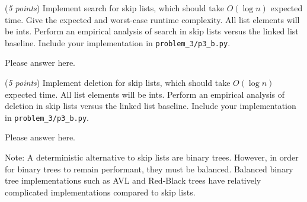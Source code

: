 \documentclass{hw_template}
\begin{document}
\begin{problem}
\begin{subproblem}
(\textit{5 points}) Implement search for skip lists, which should take $O(\log n)$ expected time.
Give the expected and worst-case runtime complexity.
All list elements will be ints.
Perform an empirical analysis of search in skip lists versus the linked list baseline.
Include your implementation in \texttt{problem\_3/p3\_b.py}.
\end{subproblem}
\begin{solution}
Please answer here.
\end{solution}


\begin{subproblem}
(\textit{5 points}) Implement deletion for skip lists, which should take $O(\log n)$ expected time.
All list elements will be ints.
Perform an empirical analysis of deletion in skip lists versus the linked list baseline.
Include your implementation in \texttt{problem\_3/p3\_b.py}.
\end{subproblem}
\begin{solution}
Please answer here.
\end{solution}


Note: A deterministic alternative to skip lists are binary trees.
However, in order for binary trees to remain performant,
they must be balanced. Balanced binary tree implementations such as
AVL and Red-Black trees have relatively complicated implementations compared to skip lists.

\end{problem}
\newpage

 
\end{document}
